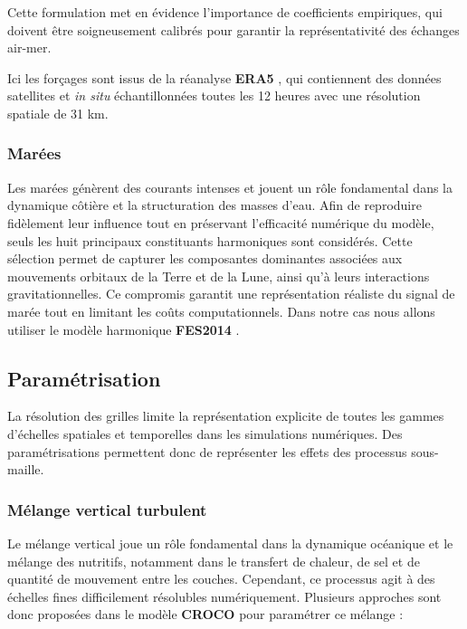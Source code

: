 Cette formulation met en évidence l’importance de coefficients empiriques, qui doivent être soigneusement calibrés pour garantir la représentativité des échanges air-mer.

Ici les forçages sont issus de la réanalyse \textbf{ERA5} \cite{hersbach_era5_2020}, qui contiennent des données satellites et \textit{in situ} échantillonnées	 toutes les 12 heures avec une résolution spatiale de 31 km. 

\subsubsection{Marées}

Les marées génèrent des courants intenses et jouent un rôle fondamental dans la dynamique côtière et la structuration des masses d’eau. Afin de reproduire fidèlement leur influence tout en préservant l’efficacité numérique du modèle, seuls les huit principaux constituants harmoniques sont considérés. Cette sélection permet de capturer les composantes dominantes associées aux mouvements orbitaux de la Terre et de la Lune, ainsi qu’à leurs interactions gravitationnelles. Ce compromis garantit une représentation réaliste du signal de marée tout en limitant les coûts computationnels. Dans notre cas nous allons utiliser le modèle harmonique \textbf{FES2014} \cite{carrere_fes_2015}.

\subsection{Paramétrisation}

La résolution des grilles limite la représentation explicite de toutes les gammes d'échelles spatiales et temporelles dans les simulations numériques. Des paramétrisations permettent donc de représenter les effets des processus sous-maille.
\subsubsection{Mélange vertical turbulent}

Le mélange vertical joue un rôle fondamental dans la dynamique océanique et le mélange des nutritifs, notamment dans le transfert de chaleur, de sel et de quantité de mouvement entre les couches. Cependant, ce processus agit à des échelles fines difficilement résolubles numériquement. Plusieurs approches sont donc proposées dans le modèle \textbf{CROCO} pour paramétrer ce mélange :

